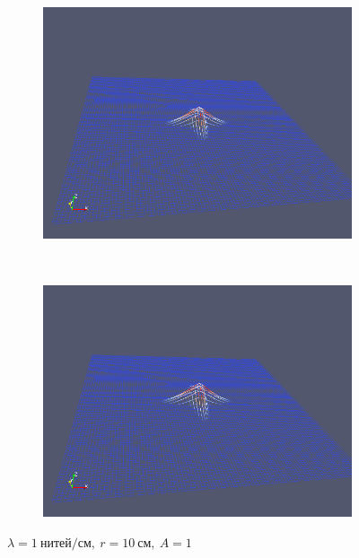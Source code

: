 \begin{figure}[H]
\begin{subfigure}[t]{0.5\textwidth}
        \includegraphics[width=\textwidth]{img/fiber/density_1_radius_10_amplitude_1/5.png}
    \end{subfigure}%
    ~
    \begin{subfigure}[t]{0.5\textwidth}
        \centering
        \includegraphics[width=\textwidth]{img/fiber/density_1_radius_10_amplitude_1/6.png}
    \end{subfigure}
    \caption{$\lambda=1~нитей/см,~r=10~см,~A=1$}
\end{figure}

